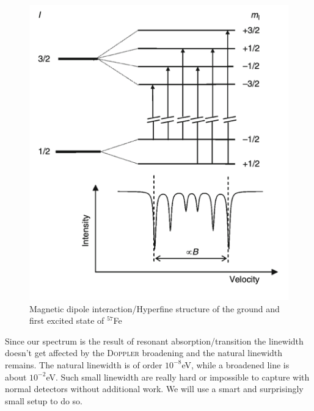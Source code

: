 \documentclass[11pt,a4paper,notitlepage]{scrartcl}
\begin{document}
	\begin{figure}[H]
	\centering
	\includegraphics[width=0.5\linewidth]{figs/hyperfine.png}
	\caption{Magnetic dipole interaction/Hyperfine structure of the ground and first excited state of $^{57}$Fe \cite{chemistry}}\label{fig:hyperfine}
\end{figure}
Since our spectrum is the result of resonant absorption/transition the linewidth doesn't get affected by the \textsc{Doppler} broadening and the natural linewidth remains. The natural linewidth is of order $10^{-8}$eV, while a broadened line is about $10^{-2}$eV. Such small linewidth are really hard or impossible to capture with normal detectors without additional work. We will use a smart and surprisingly small setup to do so. \cite{chemistry}
\newpage
\end{document}
